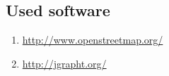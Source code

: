 \documentclass[a4paper]{article}
\begin{document}
\subsection{Used software} \label{openStreet}
\begin{enumerate}
	
\item \url{http://www.openstreetmap.org/}\label{itm:openStreet}
\item \url{http://jgrapht.org/}

\end{enumerate}

\newpage
\appendix

	
\end{document}
